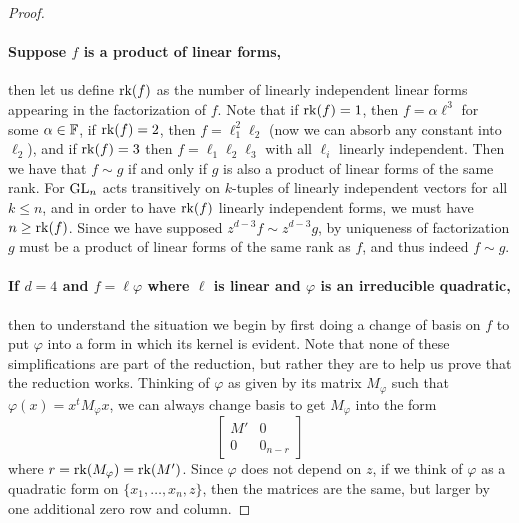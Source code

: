 \documentclass[11pt]{article}
\begin{document}
\begin{proof}
\paragraph{Suppose $f$ is a product of linear forms,} then let us define $\mathrm{rk}(f)$ as the number of linearly independent linear forms appearing in the factorization of $f$. Note that if $\mathrm{rk}(f)=1$, then $f = \alpha \ell^3$ for some $\alpha \in \mathbb{F}$, if $\mathrm{rk}(f)=2$, then $f = \ell_1^2 \ell_2$ (now we can absorb any constant into $\ell_2$), and if $\mathrm{rk}(f)=3$ then $f = \ell_1 \ell_2 \ell_3$ with all $\ell_i$ linearly independent. Then we have that $f \sim g$ if and only if $g$ is also a product of linear forms of the same rank. For $\mathrm{GL}_n$ acts transitively on $k$-tuples of linearly independent vectors for all $k \leq n$, and in order to have $\mathrm{rk}(f)$ linearly independent forms, we must have $n \geq \mathrm{rk}(f)$. Since we have supposed $z^{d-3} f \sim z^{d-3} g$, by uniqueness of factorization $g$ must be a product of linear forms of the same rank as $f$, and thus indeed $f \sim g$.

\paragraph{If $d=4$ and $f = \ell \varphi$ where $\ell$ is linear and $\varphi$ is an irreducible quadratic,} then to understand the situation we begin by first doing a change of basis on $f$ to put $\varphi$ into a form in which its kernel is evident. Note that none of these simplifications are part of the reduction, but rather they are to help us prove that the reduction works. Thinking of $\varphi$ as given by its matrix $M_{\varphi}$ such that $\varphi(x) = x^t M_{\varphi} x$, we can always change basis to get $M_{\varphi}$ into the form
\[
\begin{bmatrix}
M' & 0 \\
0& 0_{n-r}
\end{bmatrix}
\]
where $r = \mathrm{rk}(M_{\varphi}) = \mathrm{rk}(M')$. Since $\varphi$ does not depend on $z$, if we think of $\varphi$ as a quadratic form on $\{x_1, \dotsc, x_n, z\}$, then the matrices are the same, but larger by one additional zero row and column.


\end{proof}
\end{document}
